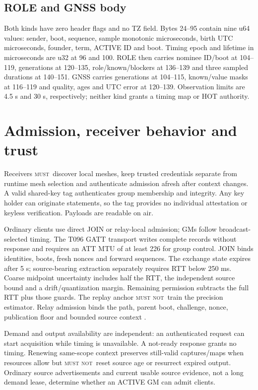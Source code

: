\documentclass[11pt,letterpaper]{article}
\newcommand{\must}{\textsc{must}}\newcommand{\mustnot}{\textsc{must not}}\newcommand{\should}{\textsc{should}}\newcommand{\code}[1]{\texttt{#1}}\newcommand{\page}{\clearpage}
\begin{document}
\subsection*{ROLE and GNSS body}
Both kinds have zero header flags and no TZ field. Bytes 24--95 contain nine u64 values: sender, boot, sequence, sample monotonic microseconds, birth UTC microseconds, founder, term, ACTIVE ID and boot. Timing epoch and lifetime in microseconds are u32 at 96 and 100. ROLE then carries nominee ID/boot at 104--119, generations at 120--135, role/known/blockers at 136--139 and three sampled durations at 140--151. GNSS carries generations at 104--115, known/value masks at 116--119 and quality, ages and UTC error at 120--139. Observation limits are 4.5 s and 30 s, respectively; neither kind grants a timing map or HOT authority.

\page
\section{Admission, receiver behavior and trust}
Receivers \must\ discover local meshes, keep trusted credentials separate from runtime mesh selection and authenticate admission afresh after context changes. A valid shared-key tag authenticates group membership and integrity. Any key holder can originate statements, so the tag provides no individual attestation or keyless verification. Payloads are readable on air.

Ordinary clients use direct JOIN or relay-local admission; GMs follow broadcast-selected timing. The T096 GATT transport writes complete records without response and requires an ATT MTU of at least 226 for group control. JOIN binds identities, boots, fresh nonces and forward sequences. The exchange state expires after 5 s; source-bearing extraction separately requires RTT below 250 ms. Coarse midpoint uncertainty includes half the RTT, the independent source bound and a drift/quantization margin. Remaining permission subtracts the full RTT plus those guards. The replay anchor \mustnot\ train the precision estimator. Relay admission binds the path, parent boot, challenge, nonce, publication floor and bounded source context \cite{wire}.

Demand and output availability are independent: an authenticated request can start acquisition while timing is unavailable. A not-ready response grants no timing. Renewing same-scope context preserves still-valid captures/maps when resources allow but \mustnot\ reset source age or resurrect expired output. Ordinary source advertisements and current usable source evidence, not a long demand lease, determine whether an ACTIVE GM can admit clients.
\end{document}
